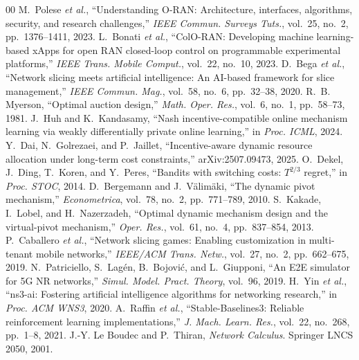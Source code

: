 \documentclass[conference]{IEEEtran}
\theoremstyle{definition}
\theoremstyle{remark}
\begin{document}
\begin{thebibliography}{00}
 M.~Polese \emph{et al.}, ``Understanding O-RAN: Architecture, interfaces, algorithms, security, and research challenges,'' \emph{IEEE Commun. Surveys Tuts.}, vol.~25, no.~2, pp.~1376--1411, 2023.
 L.~Bonati \emph{et al.}, ``ColO-RAN: Developing machine learning-based xApps for open RAN closed-loop control on programmable experimental platforms,'' \emph{IEEE Trans. Mobile Comput.}, vol.~22, no.~10, 2023.
 D.~Bega \emph{et al.}, ``Network slicing meets artificial intelligence: An AI-based framework for slice management,'' \emph{IEEE Commun. Mag.}, vol.~58, no.~6, pp.~32--38, 2020.
 R.~B. Myerson, ``Optimal auction design,'' \emph{Math. Oper. Res.}, vol.~6, no.~1, pp.~58--73, 1981.
 J.~Huh and K.~Kandasamy, ``Nash incentive-compatible online mechanism learning via weakly differentially private online learning,'' in \emph{Proc. ICML}, 2024.
 Y.~Dai, N.~Golrezaei, and P.~Jaillet, ``Incentive-aware dynamic resource allocation under long-term cost constraints,'' arXiv:2507.09473, 2025.
 O.~Dekel, J.~Ding, T.~Koren, and Y.~Peres, ``Bandits with switching costs: $T^{2/3}$ regret,'' in \emph{Proc. STOC}, 2014.
 D.~Bergemann and J.~V\"alim\"aki, ``The dynamic pivot mechanism,'' \emph{Econometrica}, vol.~78, no.~2, pp.~771--789, 2010.
 S.~Kakade, I.~Lobel, and H.~Nazerzadeh, ``Optimal dynamic mechanism design and the virtual-pivot mechanism,'' \emph{Oper. Res.}, vol.~61, no.~4, pp.~837--854, 2013.
 P.~Caballero \emph{et al.}, ``Network slicing games: Enabling customization in multi-tenant mobile networks,'' \emph{IEEE/ACM Trans. Netw.}, vol.~27, no.~2, pp.~662--675, 2019.
 N.~Patriciello, S.~Lag\'en, B.~Bojovi\'c, and L.~Giupponi, ``An E2E simulator for 5G NR networks,'' \emph{Simul. Model. Pract. Theory}, vol.~96, 2019.
 H.~Yin \emph{et al.}, ``ns3-ai: Fostering artificial intelligence algorithms for networking research,'' in \emph{Proc. ACM WNS3}, 2020.
 A.~Raffin \emph{et al.}, ``Stable-Baselines3: Reliable reinforcement learning implementations,'' \emph{J. Mach. Learn. Res.}, vol.~22, no.~268, pp.~1--8, 2021.
 J.-Y. Le Boudec and P.~Thiran, \emph{Network Calculus}. Springer LNCS 2050, 2001.
\end{thebibliography}
\end{document}
